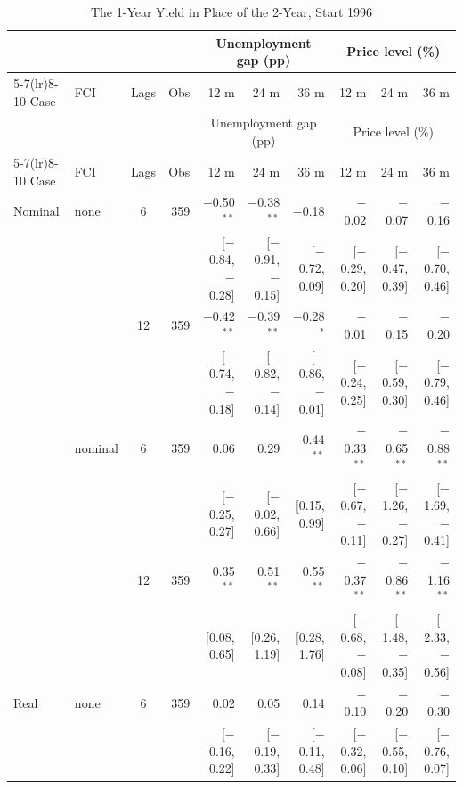 \begingroup\scriptsize\setlength{\tabcolsep}{0.9pt}
\begin{longtable}{llcrrrrrrr}
\caption{The 1-Year Yield in Place of the 2-Year, Start 1996}\label{tab:appA4}\\
\toprule
 & & & & \multicolumn{3}{c}{Unemployment gap (pp)} & \multicolumn{3}{c}{Price level (\%)}\\ \cmidrule(lr){5-7}\cmidrule(lr){8-10}
Case & FCI & Lags & Obs & 12 m & 24 m & 36 m & 12 m & 24 m & 36 m\\
\midrule\endfirsthead
\toprule
 & & & & \multicolumn{3}{c}{Unemployment gap (pp)} & \multicolumn{3}{c}{Price level (\%)}\\ \cmidrule(lr){5-7}\cmidrule(lr){8-10}
Case & FCI & Lags & Obs & 12 m & 24 m & 36 m & 12 m & 24 m & 36 m\\
\midrule\endhead
\bottomrule\endfoot
Nominal & none & 6 & 359 & $-$0.50$^{**}$ & $-$0.38$^{**}$ & $-$0.18 & $-$0.02 & $-$0.07 & $-$0.16\\
 & & & & {\scriptsize [$-$0.84, $-$0.28]} & {\scriptsize [$-$0.91, $-$0.15]} & {\scriptsize [$-$0.72, 0.09]} & {\scriptsize [$-$0.29, 0.20]} & {\scriptsize [$-$0.47, 0.39]} & {\scriptsize [$-$0.70, 0.46]}\\
 &  & 12 & 359 & $-$0.42$^{**}$ & $-$0.39$^{**}$ & $-$0.28$^{*}$ & $-$0.01 & $-$0.15 & $-$0.20\\
 & & & & {\scriptsize [$-$0.74, $-$0.18]} & {\scriptsize [$-$0.82, $-$0.14]} & {\scriptsize [$-$0.86, $-$0.01]} & {\scriptsize [$-$0.24, 0.25]} & {\scriptsize [$-$0.59, 0.30]} & {\scriptsize [$-$0.79, 0.46]}\\
 & nominal & 6 & 359 & 0.06 & 0.29 & 0.44$^{**}$ & $-$0.33$^{**}$ & $-$0.65$^{**}$ & $-$0.88$^{**}$\\
 & & & & {\scriptsize [$-$0.25, 0.27]} & {\scriptsize [$-$0.02, 0.66]} & {\scriptsize [0.15, 0.99]} & {\scriptsize [$-$0.67, $-$0.11]} & {\scriptsize [$-$1.26, $-$0.27]} & {\scriptsize [$-$1.69, $-$0.41]}\\
 &  & 12 & 359 & 0.35$^{**}$ & 0.51$^{**}$ & 0.55$^{**}$ & $-$0.37$^{**}$ & $-$0.86$^{**}$ & $-$1.16$^{**}$\\
 & & & & {\scriptsize [0.08, 0.65]} & {\scriptsize [0.26, 1.19]} & {\scriptsize [0.28, 1.76]} & {\scriptsize [$-$0.68, $-$0.08]} & {\scriptsize [$-$1.48, $-$0.35]} & {\scriptsize [$-$2.33, $-$0.56]}\\
\addlinespace
Real & none & 6 & 359 & 0.02 & 0.05 & 0.14 & $-$0.10 & $-$0.20 & $-$0.30\\
 & & & & {\scriptsize [$-$0.16, 0.22]} & {\scriptsize [$-$0.19, 0.33]} & {\scriptsize [$-$0.11, 0.48]} & {\scriptsize [$-$0.32, 0.06]} & {\scriptsize [$-$0.55, 0.10]} & {\scriptsize [$-$0.76, 0.07]}\\

\end{longtable}
